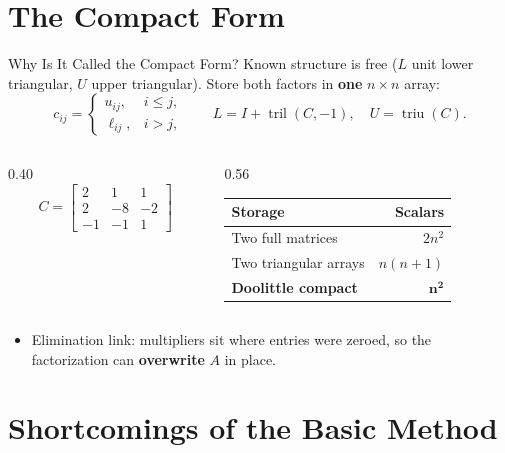 \documentclass[11pt,aspectratio=169]{beamer}
\newcommand{\mat}[1]{\begin{bmatrix}#1\end{bmatrix}}
\begin{document}
\section{The Compact Form}

\begin{frame}{Why Is It Called the Compact Form?}
  Known structure is free ($L$ unit lower triangular, $U$ upper triangular).
  Store both factors in \textbf{one} $n\times n$ array:
  \[
    c_{ij}=\begin{cases}u_{ij},&i\le j,\\ \ell_{ij},&i>j,\end{cases}
    \qquad L=I+\operatorname{tril}(C,-1),\quad U=\operatorname{triu}(C).
  \]
  \begin{columns}[T]
    \begin{column}{0.40\textwidth}
      \[
        C=\mat{2&1&1\\2&-8&-2\\-1&-1&1}
      \]
    \end{column}
    \begin{column}{0.56\textwidth}
      \begin{tabular}{@{}lr@{}}
        \toprule
        Storage & Scalars \\
        \midrule
        Two full matrices       & $2n^2$ \\
        Two triangular arrays   & $n(n+1)$ \\
        \textbf{Doolittle compact} & $\mathbf{n^2}$ \\
        \bottomrule
      \end{tabular}
    \end{column}
  \end{columns}
  \begin{itemize}
    \item Elimination link: multipliers sit where entries were zeroed, so the
      factorization can \textbf{overwrite} $A$ in place.
  \end{itemize}
\end{frame}

\section{Shortcomings of the Basic Method}
\end{document}
